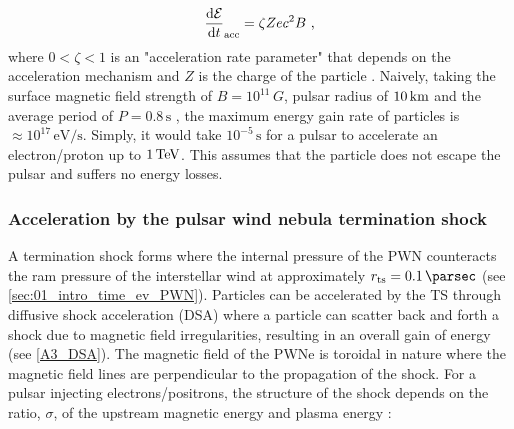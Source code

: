 \begin{equation}
    \begin{aligned}
    \dv{\mathcal{E}}{t}_\text{acc}=\zeta Zec^2B\text{ ,}
    \end{aligned}
\end{equation}
where $0<\zeta<1$ is an "acceleration rate parameter" that depends on the acceleration mechanism and $Z$ is the charge of the particle \citep{2022arXiv221116020T}. Naively, taking the surface magnetic field strength of $B=10^{11}\,\si{G}$, pulsar radius of $10\,\si{\kilo\meter}$ and the average period of $P=0.8\,\si{\second}$ \citep{2005AJ....129.1993M}, the maximum energy gain rate of particles is $\approx 10^{17}\,\si{\electronvolt\per\second}$. Simply, it would take $10^{-5}\,\si{\second}$ for a pulsar to accelerate an electron/proton up to $1\,\TeV$. This assumes that the particle does not escape the pulsar and suffers no energy losses.

\subsubsection{Acceleration by the pulsar wind nebula termination shock}

A termination shock forms where the internal pressure of the PWN counteracts the ram pressure of the interstellar wind at approximately $r_\text{ts}=0.1\,\pc$ (see \autoref{sec:01_intro_time_ev_PWN}). Particles can be accelerated by the TS through diffusive shock acceleration (DSA) where a particle can scatter back and forth a shock due to magnetic field irregularities, resulting in an overall gain of energy (see \autoref{A3_DSA}).
\newpar
The magnetic field of the PWNe is toroidal in nature where the magnetic field lines are perpendicular to the propagation of the shock. For a pulsar injecting electrons/positrons, the structure of the shock depends on the ratio, $\sigma$, of the upstream magnetic energy and plasma energy \citep{1992ApJ...391...73G}:

